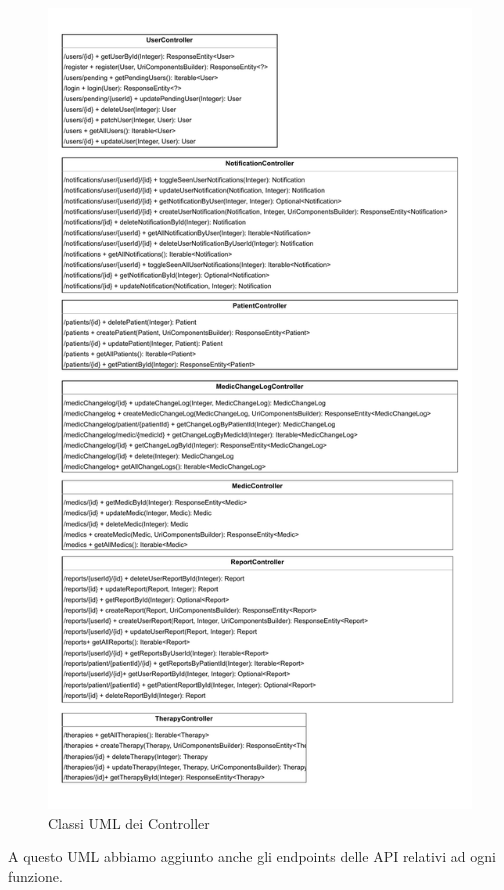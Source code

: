 \documentclass[a4paper]{article}
\begin{document}
\begin{figure}[H]
  \begin{center}
    \includegraphics[width=1\textwidth]{uml.pdf}
  \end{center}
  \caption{Classi UML dei Controller} 
  \label{fig:controller}
\end{figure}
\noindent
A questo UML abbiamo aggiunto anche gli endpoints delle API
relativi ad ogni funzione.
\end{document}
